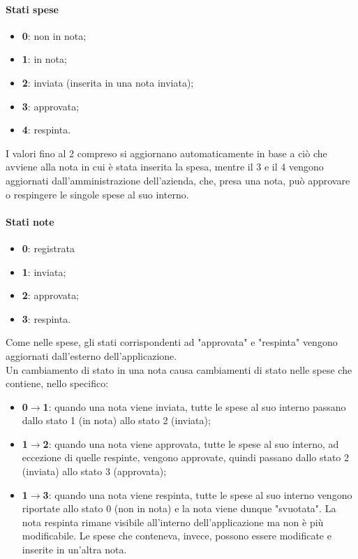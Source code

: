 \paragraph{Stati spese}
\begin{itemize}
    \item \textbf{0}: non in nota;
    \item \textbf{1}: in nota;
    \item \textbf{2}: inviata (inserita in una nota inviata);
    \item \textbf{3}: approvata;
    \item \textbf{4}: respinta.
\end{itemize}

\noindent I valori fino al 2 compreso si aggiornano automaticamente in base a ciò che avviene alla nota in cui è stata inserita la spesa, mentre il 3 e il 4 vengono aggiornati dall'amministrazione dell'azienda, che, presa una nota, può approvare o respingere le singole spese al suo interno.

\paragraph{Stati note}
\begin{itemize}
    \item \textbf{0}: registrata
    \item \textbf{1}: inviata;
    \item \textbf{2}: approvata;
    \item \textbf{3}: respinta.
\end{itemize}

\noindent Come nelle spese, gli stati corrispondenti ad "approvata" e "respinta" vengono aggiornati dall'esterno dell'applicazione.\\
Un cambiamento di stato in una nota causa cambiamenti di stato nelle spese che contiene, nello specifico:
\begin{itemize}
    \item \textbf{0$\to$1}: quando una nota viene inviata, tutte le spese al suo interno passano dallo stato 1 (in nota) allo stato 2 (inviata);
    \item \textbf{1$\to$2}: quando una nota viene approvata, tutte le spese al suo interno, ad eccezione di quelle respinte, vengono approvate, quindi passano dallo stato 2 (inviata) allo stato 3 (approvata);
    \item \textbf{1$\to$3}: quando una nota viene respinta, tutte le spese al suo interno vengono riportate allo stato 0 (non in nota) e la nota viene dunque "svuotata". La nota respinta rimane visibile all'interno dell'applicazione ma non è più modificabile. Le spese che conteneva, invece, possono essere modificate e inserite in un'altra nota.
\end{itemize}

